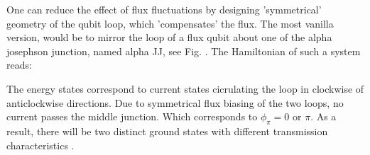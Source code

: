  One can reduce the effect of flux fluctuations by designing 'symmetrical' geometry of the qubit loop, which 'compensates' the flux.  The most vanilla version, would be to mirror the loop of a flux qubit  about one of the alpha josephson junction, named alpha JJ, see Fig. . The Hamiltonian of such a system reads:
  
 The energy states correspond to current states cicrulating the loop in clockwise of anticlockwise directions. Due to symmetrical flux biasing of the two loops, no current passes the middle junction. Which corresponds to \ra $ \phi_\pi = 0 \text{ or } \pi $. As a result, there will be two distinct ground states with different transmission characteristics .